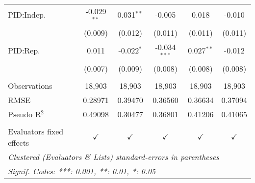 \begin{tabular}{lccccc}
   PID:Indep.               & -0.029$^{**}$  & 0.031$^{**}$   & -0.005         & 0.018                  & -0.010\\   
                            & (0.009)        & (0.012)        & (0.011)        & (0.011)                & (0.011)\\   
   PID:Rep.                 & 0.011          & -0.022$^{*}$   & -0.034$^{***}$ & 0.027$^{**}$           & -0.012\\   
                            & (0.007)        & (0.009)        & (0.008)        & (0.008)                & (0.008)\\   
    \\
   Observations             & 18,903         & 18,903         & 18,903         & 18,903                 & 18,903\\  
   RMSE                     & 0.28971        & 0.39470        & 0.36560        & 0.36634                & 0.37094\\  
   Pseudo R$^2$             & 0.49098        & 0.30477        & 0.36801        & 0.41206                & 0.41065\\  
    \\
   Evaluators fixed effects & $\checkmark$   & $\checkmark$   & $\checkmark$   & $\checkmark$           & $\checkmark$\\   
   \bottomrule
   \multicolumn{6}{l}{\emph{Clustered (Evaluators \& Lists) standard-errors in parentheses}}\\
   \multicolumn{6}{l}{\emph{Signif. Codes: ***: 0.001, **: 0.01, *: 0.05}}\\
\end{tabular}
\par\endgroup


